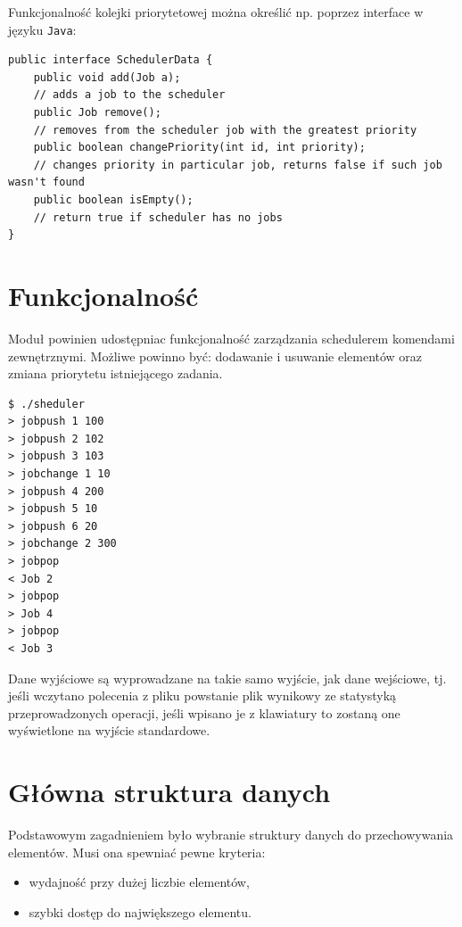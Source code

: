 \documentclass[12pt,a4paper]{article}
\begin{document}
Funkcjonalność kolejki priorytetowej można określić np. poprzez interface w języku \texttt{Java}:

\begin{lstlisting}[caption=Interface kolejki priorytetowej]
public interface SchedulerData {
    public void add(Job a); 
    // adds a job to the scheduler    
    public Job remove(); 
    // removes from the scheduler job with the greatest priority
    public boolean changePriority(int id, int priority); 
    // changes priority in particular job, returns false if such job wasn't found
    public boolean isEmpty(); 
    // return true if scheduler has no jobs
}
\end{lstlisting}

\section{Funkcjonalność}

Moduł powinien udostępniac funkcjonalność zarządzania schedulerem komendami zewnętrznymi. Możliwe powinno być: dodawanie i usuwanie elementów oraz zmiana priorytetu istniejącego zadania.

\begin{lstlisting}[caption=Przykładowa sesja modułu]
$ ./sheduler
> jobpush 1 100
> jobpush 2 102
> jobpush 3 103
> jobchange 1 10
> jobpush 4 200
> jobpush 5 10
> jobpush 6 20
> jobchange 2 300
> jobpop
< Job 2
> jobpop
> Job 4
> jobpop
< Job 3
\end{lstlisting}

Dane wyjściowe są wyprowadzane na takie samo wyjście, jak dane wejściowe, tj. jeśli wczytano polecenia z pliku powstanie plik wynikowy ze statystyką przeprowadzonych operacji, jeśli wpisano je z klawiatury to zostaną one wyświetlone na wyjście standardowe.

\section{Główna struktura danych}

Podstawowym zagadnieniem było wybranie struktury danych do przechowywania elementów. Musi ona spewniać pewne kryteria:

\begin{itemize}
	\item wydajność przy dużej liczbie elementów,
	\item szybki dostęp do największego elementu.
\end{itemize}
\end{document}
